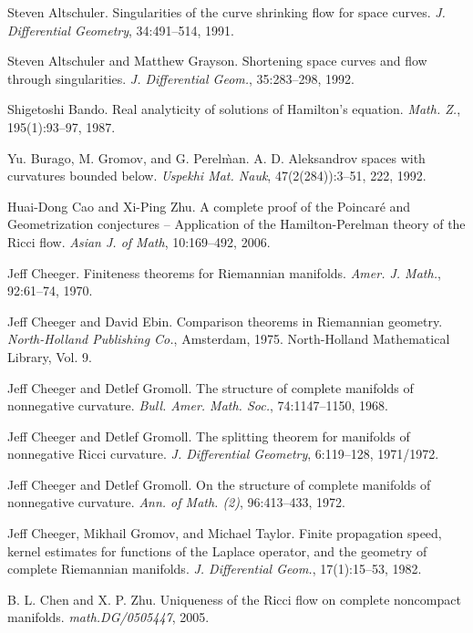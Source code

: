 
\begin{thebibliography}{99}
    Steven Altschuler. Singularities of the curve shrinking flow for space curves. \textit{J. Differential Geometry}, 34:491–514, 1991.
    
    Steven Altschuler and Matthew Grayson. Shortening space curves and flow through singularities. \textit{J. Differential Geom.}, 35:283–298, 1992.
    
    Shigetoshi Bando. Real analyticity of solutions of Hamilton’s equation. \textit{Math. Z.}, 195(1):93–97, 1987.
    
    Yu. Burago, M. Gromov, and G. Perel\`man. A. D. Aleksandrov spaces with curvatures bounded below. \textit{Uspekhi Mat. Nauk}, 47(2(284)):3–51, 222, 1992.
    
    Huai-Dong Cao and Xi-Ping Zhu. A complete proof of the Poincaré and Geometrization conjectures – Application of the Hamilton-Perelman theory of the Ricci flow. \textit{Asian J. of Math}, 10:169–492, 2006.
    
    Jeff Cheeger. Finiteness theorems for Riemannian manifolds. \textit{Amer. J. Math.}, 92:61–74, 1970.
    
    Jeff Cheeger and David Ebin. Comparison theorems in Riemannian geometry. \textit{North-Holland Publishing Co.}, Amsterdam, 1975. North-Holland Mathematical Library, Vol. 9.
    
    Jeff Cheeger and Detlef Gromoll. The structure of complete manifolds of nonnegative curvature. \textit{Bull. Amer. Math. Soc.}, 74:1147–1150, 1968.
    
    Jeff Cheeger and Detlef Gromoll. The splitting theorem for manifolds of nonnegative Ricci curvature. \textit{J. Differential Geometry}, 6:119–128, 1971/1972.
    
    Jeff Cheeger and Detlef Gromoll. On the structure of complete manifolds of nonnegative curvature. \textit{Ann. of Math. (2)}, 96:413–433, 1972.
    
    Jeff Cheeger, Mikhail Gromov, and Michael Taylor. Finite propagation speed, kernel estimates for functions of the Laplace operator, and the geometry of complete Riemannian manifolds. \textit{J. Differential Geom.}, 17(1):15–53, 1982.
    
    B. L. Chen and X. P. Zhu. Uniqueness of the Ricci flow on complete noncompact manifolds. \textit{math.DG/0505447}, 2005.
    

\end{thebibliography}
